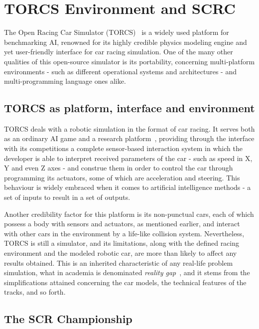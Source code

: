 \section{\textbf{TORCS Environment and SCRC}} \label{sec:Environment}

	The Open Racing Car Simulator (TORCS)~\cite{TORCS} is a widely used platform for benchmarking AI, renowned for
	its	highly credible physics modeling engine and yet user-friendly interface for car racing simulation. One of
	the	many other qualities of this open-source simulator is its portability, concerning multi-platform environments
	- such as different operational systems and architectures - and multi-programming language ones alike.

\subsection{TORCS as platform, interface and environment} \label{subsec:TORCS}
	
	TORCS deals with a robotic simulation in the format of car racing. It serves both as an ordinary AI game and a
	research platform~\cite{2009}, providing through the interface with its competitions a complete sensor-based
	interaction system in which the developer is able to interpret received parameters of the car - such as speed in
	X, Y and even Z axes - and construe them in order to control the car through programming its actuators, some of
	which are acceleration and steering. This behaviour is widely embraced when it comes to artificial intelligence
	methods - a set of inputs to result in a set of outputs.
	
	Another credibility factor for this platform is its non-punctual cars, each of which possess a body with sensors
	and actuators, as mentioned earlier, and interact with other cars in the environment by a life-like collision
	system. Nevertheless, TORCS is still a simulator, and its limitations, along with the defined racing environment
	and the modeled robotic car, are more than likely to affect any results obtained. This is an inherited
	characteristic of any real-life problem simulation, what in academia is denominated \emph{reality gap}~\cite{RG}, and it stems from the simplifications attained concerning the car models, the technical features of the tracks,
	and so forth.

\subsection{The SCR Championship} \label{subsec:SCRC}


